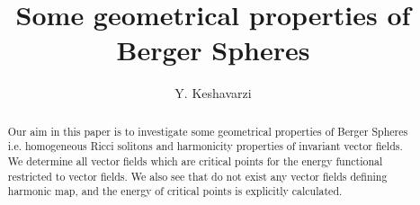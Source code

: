 \documentclass[11pt,oneside,leqno]{amsart}
\theoremstyle{plain}
\begin{document}
\title[Some geometrical properties of Berger Spheres]{Some geometrical properties of Berger Spheres}
\author{Y. Keshavarzi}
\date{}

\address{Department of Mathematics\\Payame noor University\\P.O. Box 19395-3697\\Tehran\\Iran.}

\begin{abstract}
Our aim in this paper is to investigate some geometrical properties of Berger Spheres i.e. homogeneous
Ricci solitons and harmonicity properties of invariant vector fields. We determine all vector fields which are critical points for the energy functional
restricted to vector fields. We also see that do not exist any vector fields defining harmonic map, and the energy of critical points is explicitly calculated.
\end{abstract}

\maketitle
\end{document}
